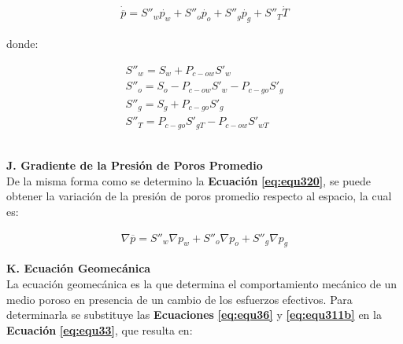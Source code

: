 \begin{ceqn} 
\begin{gather}
\label{eq:equ320} 
\dot{\overline{p}} = S''_w\dot{p_w} + S''_o\dot{p_o} + S''_g\dot{p_g} + S''_T\dot{T}
\end{gather}  
\end{ceqn}

donde:

\begin{ceqn} 
\begin{subequations} \label{eq:equ321} 
\begin{gather}
S''_w = S_w + P_{c-ow}S'_w 
\label{eq:equ321a} \\[3pt]
S''_o = S_o - P_{c-ow}S'_w - P_{c-go}S'_g
\label{eq:equ321b} \\[3pt]
S''_g = S_g + P_{c-go}S'_g
\label{eq:equ321c} \\[3pt]
S''_{T} = P_{c-go}S'_{gT} - P_{c-ow}S'_{wT}
\label{eq:equ321d}
\end{gather}  
\end{subequations} 
\end{ceqn}
\\

\textbf{J. Gradiente de la Presión de Poros Promedio}
\\
De la misma forma como se determino la \textbf{Ecuación} \textbf{\ref{eq:equ320}}, se puede obtener la variación de la presión de poros promedio respecto al espacio, la cual es:

\begin{ceqn} 
\begin{gather} \label{eq:equ322} 
\nabla \overline{p} = S''_w\nabla p_w + S''_o\nabla p_o + S''_g\nabla p_g
\end{gather}  
\end{ceqn}


\textbf{K. Ecuación Geomecánica}
\\
La ecuación geomecánica es la que determina el comportamiento mecánico de un medio poroso en presencia de un cambio de los esfuerzos efectivos. Para determinarla se substituye las \textbf{Ecuaciones} \textbf{\ref{eq:equ36}} y \textbf{\ref{eq:equ311b}} en la \textbf{Ecuación} \textbf{\ref{eq:equ33}}, que resulta en:

